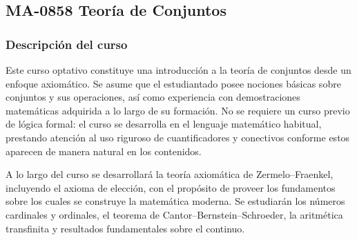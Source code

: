 \newpage
\subsection*{MA-0858 Teoría de Conjuntos}

\hypertarget{MA0858}{}
\begin{refsection}
\begin{table}[H]
\end{table}

\subsubsection*{Descripción del curso}

Este curso optativo constituye una introducción a la teoría de conjuntos desde un enfoque axiomático. Se asume que el estudiantado posee nociones básicas sobre conjuntos y sus operaciones, así como experiencia con demostraciones matemáticas adquirida a lo largo de su formación. No se requiere un curso previo de lógica formal: el curso se desarrolla en el lenguaje matemático habitual, prestando atención al uso riguroso de cuantificadores y conectivos conforme estos aparecen de manera natural en los contenidos.

A lo largo del curso se desarrollará la teoría axiomática de Zermelo--Fraenkel, incluyendo el axioma de elección, con el propósito de proveer los fundamentos sobre los cuales se construye la matemática moderna. Se estudiarán los números cardinales y ordinales, el teorema de Cantor--Bernstein--Schroeder, la aritmética transfinita y resultados fundamentales sobre el continuo.


\end{refsection}
